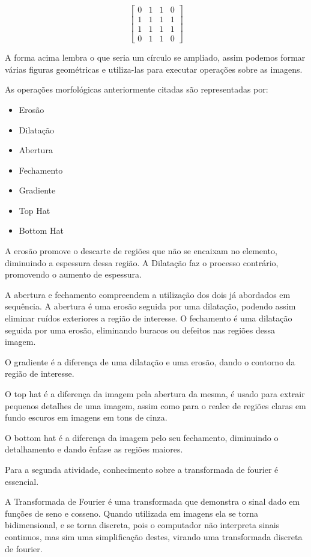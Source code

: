 \documentclass[conference]{IEEEtran}
\begin{document}
\begin{equation}
    \begin{bmatrix}
        0 & 1 & 1 & 0 \\
        1 & 1 & 1 & 1 \\
        1 & 1 & 1 & 1 \\
        0 & 1 & 1 & 0
    \end{bmatrix}
\end{equation}

A forma acima lembra o que seria um círculo se ampliado, assim podemos formar várias figuras geométricas e utiliza-las para 
executar operações sobre as imagens.

As operações morfológicas anteriormente citadas são representadas por:
\begin{itemize}
\item Erosão
\item Dilatação
\item Abertura
\item Fechamento
\item Gradiente 
\item Top Hat
\item Bottom Hat
\end{itemize}

A erosão promove o descarte de regiões que não se encaixam no elemento, diminuindo
a espessura dessa região. A Dilatação faz o processo contrário, promovendo o aumento de espessura.

A abertura e fechamento compreendem a utilização dos dois já abordados em sequência. A abertura
é uma erosão seguida por uma dilatação, podendo assim eliminar ruídos exteriores a região de interesse.
O fechamento é uma dilatação seguida por uma erosão, eliminando buracos ou defeitos nas regiões dessa imagem.

O gradiente é a diferença de uma dilatação e uma erosão, dando o contorno da região de interesse.

O top hat é a diferença da imagem pela abertura da mesma, é usado para extrair pequenos
detalhes de uma imagem, assim como para o realce de regiões claras em fundo escuros em imagens em tons de cinza.

O bottom hat é a diferença da imagem pelo seu fechamento, diminuindo o detalhamento e dando ênfase
as regiões maiores.

Para a segunda atividade, conhecimento sobre a transformada de fourier é essencial.

A Transformada de Fourier é uma transformada que demonstra o sinal dado em funções de seno e cosseno.
Quando utilizada em imagens ela se torna bidimensional, e se torna discreta, pois o computador não
interpreta sinais continuos, mas sim uma simplificação destes, virando uma transformada discreta de fourier.
\end{document}
